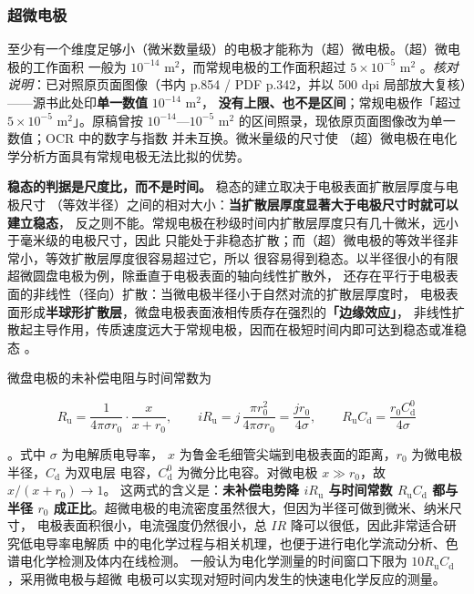 \subsubsection{超微电极}

至少有一个维度足够小（微米数量级）的电极才能称为（超）微电极。（超）微电极的工作面积
一般为 $10^{-14}$ m$^{2}$，而常规电极的工作面积超过 $5\times10^{-5}$ m$^{2}$
。\emph{核对说明}：已对照原页面图像（书内 p.854 /
PDF p.342，并以 500 dpi 局部放大复核）——源书此处印\textbf{单一数值} $10^{-14}$ m$^{2}$，
\textbf{没有上限、也不是区间}；常规电极作「超过 $5\times10^{-5}$ m$^{2}$」。原稿曾按
$10^{-14}$—$10^{-5}$ m$^{2}$ 的区间照录，现依原页面图像改为单一数值；OCR 中的数字与指数
并未互换。微米量级的尺寸使
（超）微电极在电化学分析方面具有常规电极无法比拟的优势。

\begin{principle}
\textbf{稳态的判据是尺度比，而不是时间。} 稳态的建立取决于电极表面扩散层厚度与电极尺寸
（等效半径）之间的相对大小：\textbf{当扩散层厚度显著大于电极尺寸时就可以建立稳态}，
反之则不能。常规电极在秒级时间内扩散层厚度只有几十微米，远小于毫米级的电极尺寸，因此
只能处于非稳态扩散；而（超）微电极的等效半径非常小，等效扩散层厚度很容易超过它，所以
很容易得到稳态。以半径很小的有限超微圆盘电极为例，除垂直于电极表面的轴向线性扩散外，
还存在平行于电极表面的非线性（径向）扩散：当微电极半径小于自然对流的扩散层厚度时，
电极表面形成\textbf{半球形扩散层}，微盘电极表面液相传质存在强烈的\textbf{「边缘效应」}，
非线性扩散起主导作用，传质速度远大于常规电极，因而在极短时间内即可达到稳态或准稳态
。
\end{principle}

微盘电极的未补偿电阻与时间常数为

\begin{equation}
R_{\mathrm{u}}=\frac{1}{4\pi\sigma r_0}\cdot\frac{x}{x+r_0},
\qquad
iR_{\mathrm{u}}=j\,\frac{\pi r_0^{2}}{4\pi\sigma r_0}=\frac{j r_0}{4\sigma},
\qquad
R_{\mathrm{u}}C_{\mathrm{d}}=\frac{r_0C_{\mathrm{d}}^{0}}{4\sigma}
\label{eq:ume}
\end{equation}

。式中 $\sigma$ 为电解质电导率，
$x$ 为鲁金毛细管尖端到电极表面的距离，$r_0$ 为微电极半径，$C_{\mathrm{d}}$ 为双电层
电容，$C_{\mathrm{d}}^{0}$ 为微分比电容。对微电极 $x\gg r_0$，故 $x/(x+r_0)\to1$。
这两式的含义是：\textbf{未补偿电势降 $iR_{\mathrm{u}}$ 与时间常数 $R_{\mathrm{u}}C_{\mathrm{d}}$
都与半径 $r_0$ 成正比}。超微电极的电流密度虽然很大，但因为半径可做到微米、纳米尺寸，
电极表面积很小，电流强度仍然很小，总 $IR$ 降可以很低，因此非常适合研究低电导率电解质
中的电化学过程与相关机理，也便于进行电化学流动分析、色谱电化学检测及体内在线检测。
一般认为电化学测量的时间窗口下限为 $10R_{\mathrm{u}}C_{\mathrm{d}}$，采用微电极与超微
电极可以实现对短时间内发生的快速电化学反应的测量。

